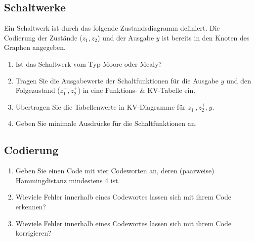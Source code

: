 \documentclass{exercisesheet}
\begin{document}
    \setcounter{subsection}{9}
    \subsection{Schaltwerke}
      Ein Schaltwerk ist durch das folgende Zustandsdiagramm definiert. Die Codierung der Zustände ($z_1, z_2$) und der Ausgabe $y$ ist bereits in den Knoten des Graphen angegeben.
      \begin{center}
      \end{center}
      \begin{enumerate}
        \item Ist das Schaltwerk vom Typ Moore oder Mealy?
        \item Tragen Sie die Ausgabewerte der Schaltfunktionen für die Ausgabe $y$ und den Folgezustand ($z_1^+, z_2^+$) in eine Funktions- \& KV-Tabelle ein.
        \item Übertragen Sie die Tabellenwerte in KV-Diagramme für $z_1^+, z_2^+, y$.
        \item Geben Sie minimale Ausdrücke für die Schaltfunktionen an.
      \end{enumerate}

    \subsection{Codierung}
      \begin{enumerate}
        \item Geben Sie einen Code mit vier Codeworten an, deren (paarweise) Hammingdistanz mindestens 4 ist.
        \item Wieviele Fehler innerhalb eines Codewortes lassen sich mit ihrem Code erkennen?
        \item Wieviele Fehler innerhalb eines Codewortes lassen sich mit ihrem Code korrigieren?
      \end{enumerate}
\end{document}
